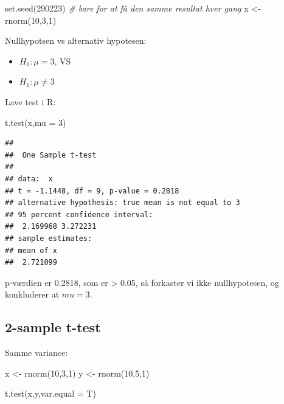 \documentclass[
]{book}
\newenvironment{Shaded}{\begin{snugshade}}{\end{snugshade}}
\newcommand{\AttributeTok}[1]{\textcolor[rgb]{0.77,0.63,0.00}{#1}}
\newcommand{\CommentTok}[1]{\textcolor[rgb]{0.56,0.35,0.01}{\textit{#1}}}
\newcommand{\DecValTok}[1]{\textcolor[rgb]{0.00,0.00,0.81}{#1}}
\newcommand{\FunctionTok}[1]{\textcolor[rgb]{0.00,0.00,0.00}{#1}}
\newcommand{\NormalTok}[1]{#1}
\newcommand{\OtherTok}[1]{\textcolor[rgb]{0.56,0.35,0.01}{#1}}
\providecommand{\tightlist}{%
  \setlength{\itemsep}{0pt}\setlength{\parskip}{0pt}}
\begin{document}
\begin{Shaded}
\begin{Highlighting}[]
\FunctionTok{set.seed}\NormalTok{(}\DecValTok{290223}\NormalTok{) }\CommentTok{\# bare for at få den samme resultat hver gang}
\NormalTok{x }\OtherTok{\textless{}{-}} \FunctionTok{rnorm}\NormalTok{(}\DecValTok{10}\NormalTok{,}\DecValTok{3}\NormalTok{,}\DecValTok{1}\NormalTok{)}
\end{Highlighting}
\end{Shaded}

Nullhypotsen vs alternativ hypotesen:

\begin{itemize}
\tightlist
\item
  \(H_{0}: \mu = 3\), VS
\item
  \(H_{1}: \mu \neq 3\)
\end{itemize}

Lave test i R:

\begin{Shaded}
\begin{Highlighting}[]
\FunctionTok{t.test}\NormalTok{(x,}\AttributeTok{mu =} \DecValTok{3}\NormalTok{)}
\end{Highlighting}
\end{Shaded}

\begin{verbatim}
## 
##  One Sample t-test
## 
## data:  x
## t = -1.1448, df = 9, p-value = 0.2818
## alternative hypothesis: true mean is not equal to 3
## 95 percent confidence interval:
##  2.169968 3.272231
## sample estimates:
## mean of x 
##  2.721099
\end{verbatim}

p-værdien er 0.2818, som er \textgreater{} 0.05, så forkaster vi ikke nullhypotesen, og konkluderer at \(mu = 3\).

\hypertarget{sample-t-test-1}{%
\subsection{2-sample t-test}\label{sample-t-test-1}}

Samme variance:

\begin{Shaded}
\begin{Highlighting}[]
\NormalTok{x }\OtherTok{\textless{}{-}} \FunctionTok{rnorm}\NormalTok{(}\DecValTok{10}\NormalTok{,}\DecValTok{3}\NormalTok{,}\DecValTok{1}\NormalTok{)}
\NormalTok{y }\OtherTok{\textless{}{-}} \FunctionTok{rnorm}\NormalTok{(}\DecValTok{10}\NormalTok{,}\DecValTok{5}\NormalTok{,}\DecValTok{1}\NormalTok{)}

\FunctionTok{t.test}\NormalTok{(x,y,}\AttributeTok{var.equal =}\NormalTok{ T)}
\end{Highlighting}
\end{Shaded}
\end{document}
